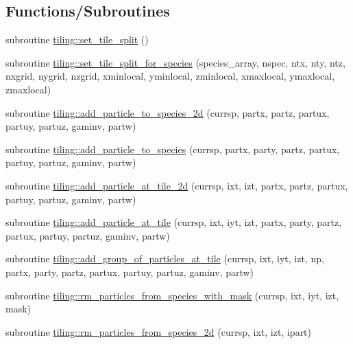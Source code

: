 \subsection*{Functions/\+Subroutines}
\begin{DoxyCompactItemize}
\item 
subroutine \hyperlink{namespacetiling_ae08843ba623397e395f3cdc2e10ffc12}{tiling\+::set\+\_\+tile\+\_\+split} ()
\item 
subroutine \hyperlink{namespacetiling_a7c0b0347269c73ea27ea2290e8417185}{tiling\+::set\+\_\+tile\+\_\+split\+\_\+for\+\_\+species} (species\+\_\+array, nspec, ntx, nty, ntz, nxgrid, nygrid, nzgrid,           	xminlocal, yminlocal, zminlocal, xmaxlocal, ymaxlocal, zmaxlocal)
\item 
subroutine \hyperlink{namespacetiling_a6d78403de2ce67688301c28455638363}{tiling\+::add\+\_\+particle\+\_\+to\+\_\+species\+\_\+2d} (currsp, partx, partz,                                                       partux, partuy, partuz, gaminv, partw)
\item 
subroutine \hyperlink{namespacetiling_a4aaddc2230da22ad8bf1bb439f24b3ee}{tiling\+::add\+\_\+particle\+\_\+to\+\_\+species} (currsp, partx, party, partz,                                                       partux, partuy, partuz, gaminv, partw)
\item 
subroutine \hyperlink{namespacetiling_acd2c914a7012265a66a69aedbb714ab9}{tiling\+::add\+\_\+particle\+\_\+at\+\_\+tile\+\_\+2d} (currsp, ixt, izt, partx, partz,                                                           partux, partuy, partuz, gaminv, partw)
\item 
subroutine \hyperlink{namespacetiling_a359fbc74072f7cc701885efa8440a648}{tiling\+::add\+\_\+particle\+\_\+at\+\_\+tile} (currsp, ixt, iyt, izt, partx, party, partz,                                                           partux, partuy, partuz, gaminv, partw)
\item 
subroutine \hyperlink{namespacetiling_a95ecc37c280961f5c094916b0fbf9724}{tiling\+::add\+\_\+group\+\_\+of\+\_\+particles\+\_\+at\+\_\+tile} (currsp, ixt, iyt, izt, np, partx, party,                                           partz, partux, partuy, partuz, gaminv, partw)
\item 
subroutine \hyperlink{namespacetiling_ad4f03c522071b6b40bc01c16b5aa1bdd}{tiling\+::rm\+\_\+particles\+\_\+from\+\_\+species\+\_\+with\+\_\+mask} (currsp, ixt, iyt, izt, mask)
\item 
subroutine \hyperlink{namespacetiling_a837e4ff4ce81c945e94ea975a1df6fc1}{tiling\+::rm\+\_\+particles\+\_\+from\+\_\+species\+\_\+2d} (currsp, ixt, izt, ipart)

\end{DoxyCompactItemize}
